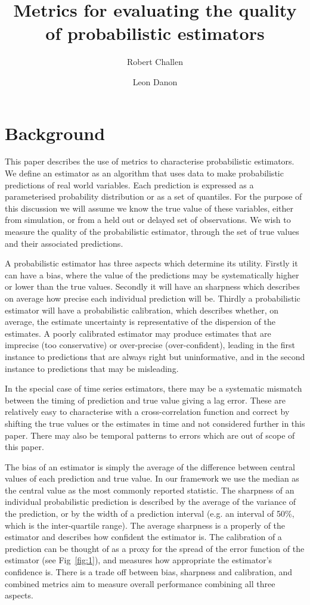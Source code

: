 \documentclass[a4paper, 12pt, twoside]{article}
\title{Metrics for evaluating the quality of probabilistic estimators}
\author[1,2]{Robert Challen}
\author[1,2]{Leon Danon}
\affil[1]{AI4CI, University of Bristol, Bristol, UK.}
\affil[2]{Department of Engineering Mathematics, University of Bristol, Bristol, UK.}
\date{}                     %
\let\Oldsection\section
\renewcommand{\section}{\FloatBarrier\Oldsection}
\begin{document}
\maketitle

\section{Background}

This paper describes the use of metrics to characterise probabilistic estimators. We define an estimator as an algorithm that uses data to make probabilistic predictions of real world variables. Each prediction is expressed as a parameterised probability distribution or as a set of quantiles. For the purpose of this discussion we will assume we know the true value of these variables, either from simulation, or from a held out or delayed set of observations. We wish to measure the quality of the probabilistic estimator, through the set of true values and their associated predictions.

A probabilistic estimator has three aspects which determine its utility. Firstly it can have a bias, where the value of the predictions may be systematically higher or lower than the true values. Secondly it will have an sharpness which describes on average how precise each individual prediction will be. Thirdly a probabilistic estimator will have a probabilistic calibration, which describes whether, on average, the estimate uncertainty is representative of the dispersion of the estimates. A poorly calibrated estimator may produce estimates that are imprecise (too conservative) or over-precise (over-confident), leading in the first instance to predictions that are always right but uninformative, and in the second instance to predictions that may be misleading.

In the special case of time series estimators, there may be a systematic mismatch between the timing of prediction and true value giving a lag error. These are relatively easy to characterise with a cross-correlation function and correct by shifting the true values or the estimates in time and not considered further in this paper. There may also be temporal patterns to errors which are out of scope of this paper.

The bias of an estimator is simply the average of the difference between central values of each prediction and true value. In our framework we use the median as the central value as the most commonly reported statistic. The sharpness of an individual probabilistic prediction is described by the average of the variance of the prediction, or by the width of a prediction interval (e.g. an interval of 50\%, which is the inter-quartile range). The average sharpness is a properly of the estimator and describes how confident the estimator is. The calibration of a prediction can be thought of as a proxy for the spread of the error function of the estimator (see Fig~\ref{fig:1}), and measures how appropriate the estimator's confidence is. There is a trade off between bias, sharpness and calibration, and combined metrics aim to measure overall performance combining all three aspects.
\end{document}

